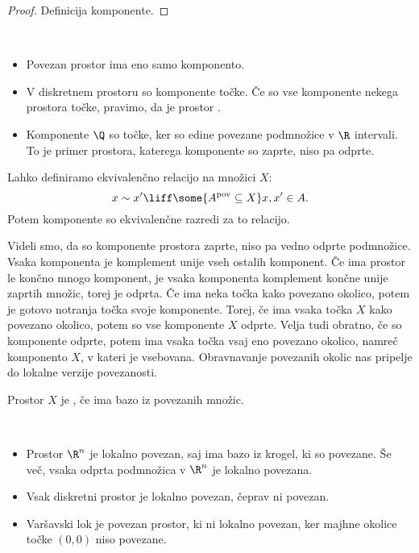 \begin{proof}
    Definicija komponente.
\end{proof}

\begin{primer}
    \ 
    \begin{itemize}
        \item Povezan prostor ima eno samo komponento.
        \item V diskretnem prostoru so komponente točke. Če so vse komponente nekega prostora točke, pravimo, da je prostor .
        \item Komponente $\Q$ so točke, ker so edine povezane podmnožice v $\R$ intervali. To je primer prostora, katerega komponente so zaprte, niso pa odprte.
    \end{itemize}
\end{primer}

\begin{opomba}
    Lahko definiramo ekvivalenčno relacijo na množici $X$:
    $$x \sim x' \liff \some{A^{\text{pov}} \subseteq X}x,x' \in A.$$
    Potem komponente so ekvivalenčne razredi za to relacijo.
\end{opomba}

Videli smo, da so komponente prostora zaprte, niso pa vedno odprte podmnožice. Vsaka komponenta je komplement unije vseh ostalih komponent. Če ima prostor le končno mnogo komponent, je vsaka komponenta komplement končne unije zaprtih množic, torej je odprta. Če ima neka točka kako povezano okolico, potem je gotovo notranja točka svoje komponente. Torej, če ima vsaka točka $X$ kako povezano okolico, potem so vse komponente $X$ odprte. Velja tudi obratno, če so komponente odprte, potem ima vsaka točka vsaj eno povezano okolico, namreč komponento $X$, v kateri je vsebovana. Obravnavanje povezanih okolic nas pripelje do lokalne verzije povezanosti.

\begin{definicija}
    Prostor $X$ je , če ima bazo iz povezanih množic.
\end{definicija}

\begin{primer}
    \ 
    \begin{itemize}
        \item Prostor $\R^n$ je lokalno povezan, saj ima bazo iz krogel, ki so povezane. Še več, vsaka odprta podmnožica v $\R^n$ je lokalno povezana.
        \item Vsak diskretni prostor je lokalno povezan, čeprav ni povezan.
        \item Varšavski lok je povezan prostor, ki ni lokalno povezan, ker majhne okolice točke $(0,0)$ niso povezane.
    \end{itemize}
\end{primer}

